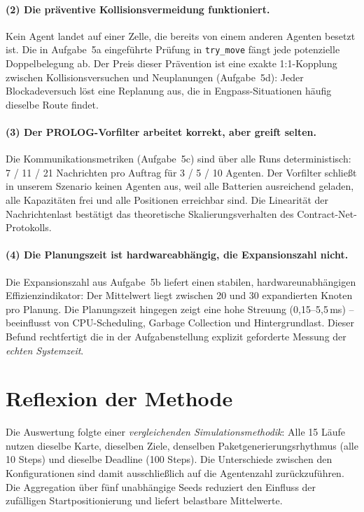 \paragraph{(2) Die präventive Kollisionsvermeidung funktioniert.}
Kein Agent landet auf einer Zelle, die bereits von einem anderen Agenten besetzt ist. Die in Aufgabe~5a eingeführte Prüfung in \texttt{try\_move} fängt jede potenzielle Doppelbelegung ab. Der Preis dieser Prävention ist eine exakte 1:1-Kopplung zwischen Kollisionsversuchen und Neuplanungen (Aufgabe~5d): Jeder Blockadeversuch löst eine Replanung aus, die in Engpass-Situationen häufig dieselbe Route findet.

\paragraph{(3) Der \acs{PROLOG}-Vorfilter arbeitet korrekt, aber greift selten.}
Die Kommunikationsmetriken (Aufgabe~5c) sind über alle Runs deterministisch: 7 / 11 / 21 Nachrichten pro Auftrag für 3 / 5 / 10 Agenten. Der Vorfilter schließt in unserem Szenario keinen Agenten aus, weil alle Batterien ausreichend geladen, alle Kapazitäten frei und alle Positionen erreichbar sind. Die Linearität der Nachrichtenlast bestätigt das theoretische Skalierungsverhalten des Contract-Net-Protokolls.

\paragraph{(4) Die Planungszeit ist hardwareabhängig, die Expansionszahl nicht.}
Die Expansionszahl aus Aufgabe~5b liefert einen stabilen, hardwareunabhängigen Effizienzindikator: Der Mittelwert liegt zwischen 20 und 30 expandierten Knoten pro Planung. Die Planungszeit hingegen zeigt eine hohe Streuung (0{,}15--5{,}5\,ms) -- beeinflusst von CPU-Scheduling, Garbage Collection und Hintergrundlast. Dieser Befund rechtfertigt die in der Aufgabenstellung explizit geforderte Messung der \textit{echten Systemzeit}.

\section{Reflexion der Methode}

Die Auswertung folgte einer \textit{vergleichenden Simulationsmethodik}: Alle 15 Läufe nutzen dieselbe Karte, dieselben Ziele, denselben Paketgenerierungsrhythmus (alle 10 Steps) und dieselbe Deadline (100 Steps). Die Unterschiede zwischen den Konfigurationen sind damit ausschließlich auf die Agentenzahl zurückzuführen. Die Aggregation über fünf unabhängige Seeds reduziert den Einfluss der zufälligen Startpositionierung und liefert belastbare Mittelwerte.

